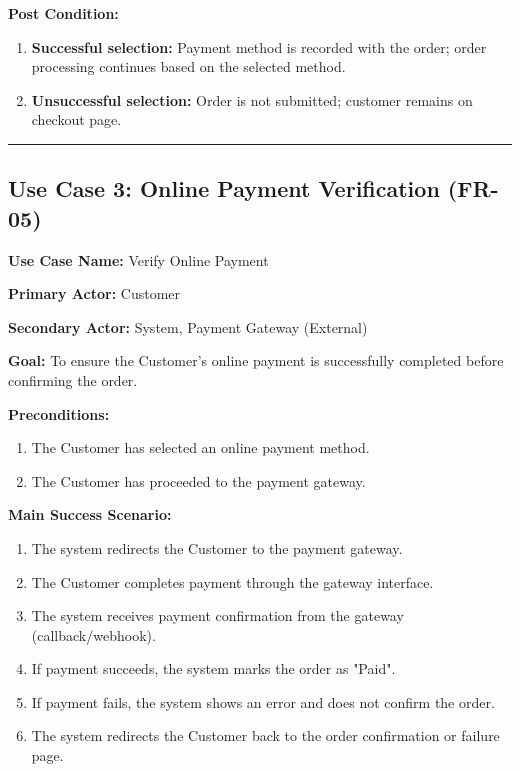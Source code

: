\textbf{Post Condition:}
\begin{enumerate}
    \item \textbf{Successful selection:} Payment method is recorded with the order; order processing continues based on the selected method.
    \item \textbf{Unsuccessful selection:} Order is not submitted; customer remains on checkout page.
\end{enumerate}

\vspace{0.5cm}
\hrule
\vspace{0.5cm}

\subsection*{Use Case 3: Online Payment Verification (FR-05)}

\textbf{Use Case Name:} Verify Online Payment

\textbf{Primary Actor:} Customer

\textbf{Secondary Actor:} System, Payment Gateway (External)

\textbf{Goal:} To ensure the Customer's online payment is successfully completed before confirming the order.

\textbf{Preconditions:}
\begin{enumerate}
    \item The Customer has selected an online payment method.
    \item The Customer has proceeded to the payment gateway.
\end{enumerate}

\textbf{Main Success Scenario:}
\begin{enumerate}
    \item The system redirects the Customer to the payment gateway.
    \item The Customer completes payment through the gateway interface.
    \item The system receives payment confirmation from the gateway (callback/webhook).
    \item If payment succeeds, the system marks the order as "Paid".
    \item If payment fails, the system shows an error and does not confirm the order.
    \item The system redirects the Customer back to the order confirmation or failure page.
\end{enumerate}

